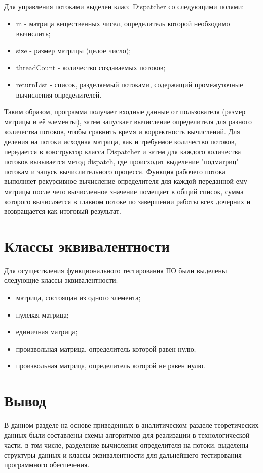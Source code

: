 \documentclass[a4paper,oneside,14pt]{extreport}
\begin{document}
Для управления потоками выделен класс Dispatcher со следующими полями:
\begin{itemize}
	\item m - матрица вещественных чисел, определитель которой необходимо вычислить;
	\item size - размер матрицы (целое число);
	\item threadCount - количество создаваемых потоков;
	\item returnList - список, разделяемый потоками, содержащий промежуточные вычисления определителей.
\end{itemize}

Таким образом, программа получает входные данные от пользователя (размер матрицы и её элементы), затем запускает вычисление определителя для разного количества потоков, чтобы сравнить время и корректность вычислений. Для деления на потоки исходная матрица, как и требуемое количество потоков, передается в конструктор класса Dispatcher и затем для каждого количества потоков вызывается метод dispatch, где происходит выделение "подматриц" потокам и запуск вычислительного процесса. Функция рабочего потока выполняет рекурсивное вычисление определителя для каждой переданной ему матрицы после чего вычисленное значение помещает в общий список, сумма которого вычисляется в главном потоке по завершении работы всех дочерних и возвращается как итоговый результат.

\section{Классы эквивалентности}
Для осуществления функционального тестирования ПО были выделены следующие классы эквивалентности:
\begin{itemize}
	\item матрица, состоящая из одного элемента;
	\item нулевая матрица;
	\item единичная матрица;
	\item произвольная матрица, определитель которой равен нулю;
	\item произвольная матрица, определитель которой не равен нулю.
\end{itemize}

\section{Вывод}
В данном разделе на основе приведенных в аналитическом разделе теоретических данных были составлены схемы алгоритмов для реализации в технологической части, в том числе, разделение вычисления определителя на потоки, выделены структуры данных и классы эквивалентности для дальнейшего тестирования программного обеспечения. 
\end{document}
